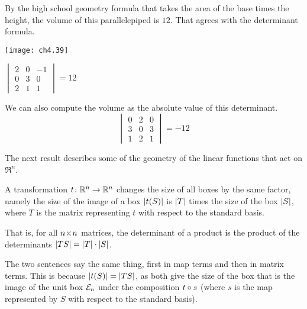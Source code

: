 \begin{example} \label{ex:VolParPiped}
By the high school geometry formula that takes the area of the
base times the height, the volume of this 
parallelepiped is $12$.
That agrees with the determinant formula.
\begin{center}
   \parbox{2in}{\hbox{}\hfil\texttt{[image: ch4.39]}\hfil\hbox{}}  
  \quad
  $\begin{vmatrix}
     2 &0 &-1\\
     0 &3 &0 \\
     2 &1 &1
  \end{vmatrix}=12$
\end{center}
We can also compute the volume
as the absolute value of this determinant. 
\begin{equation*}
  \begin{vmatrix}
     0  &2 &0 \\
     3  &0 &3 \\
     1  &2 &1
  \end{vmatrix}=-12  
\end{equation*}
\end{example}

The next result describes some of the geometry of the linear
functions that act on
\( \Re^n \). 

\begin{theorem}
\label{th:MatChVolByDetMat}
A transformation \( \mbox{$t\colon \mathbb{R}^n\to \mathbb{R}^n$} \) changes the size of all boxes
by the same factor, namely the size of the image of a box
$\deter{t(S)}$ is $\deter{T}$ times the size of the box $\deter{S}$,
where $T$ is the matrix
representing $t$ with respect to the standard basis.

That is, for all $n \! \times \! n$ matrices, the determinant of a product is the
product of the determinants $\deter{TS}=\deter{T}\cdot\deter{S}$.
\end{theorem}

The two sentences say the same thing, first in map terms and then
in matrix terms. 
This is because
$\deter{t(S)}=\deter{TS}$, as both give the size of the box that is the
image of the unit box ${\cal E}_n$ under the composition $t\mathbin\circ s$
(where $s$ is the map represented by $S$ with respect to the standard basis).


